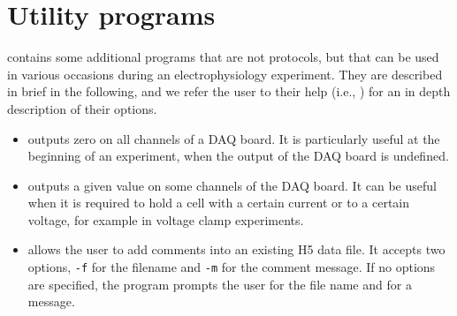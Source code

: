\section{Utility programs}
\progname contains some additional programs that are not protocols,
but that can be used in various occasions during an electrophysiology
experiment. They are described in brief in the following, and we refer
the user to their help (i.e., ) for
an in depth description of their options.
\begin{itemize}
\item {} outputs zero on all channels of a DAQ
board. It is particularly useful at the beginning of an experiment,
when the output of the DAQ board is undefined.
\item {} outputs a given value on some channels
of the DAQ board. It can be useful when it is required to hold a cell
with a certain current or to a certain voltage, for example in voltage
clamp experiments.
\item {} allows the user to add comments into
an existing H5 data file. It accepts two options, \verb+-f+ for the
filename and \verb+-m+ for the comment message. If no options are
specified, the program prompts the user for the file name and for a
message.
\end{itemize}
